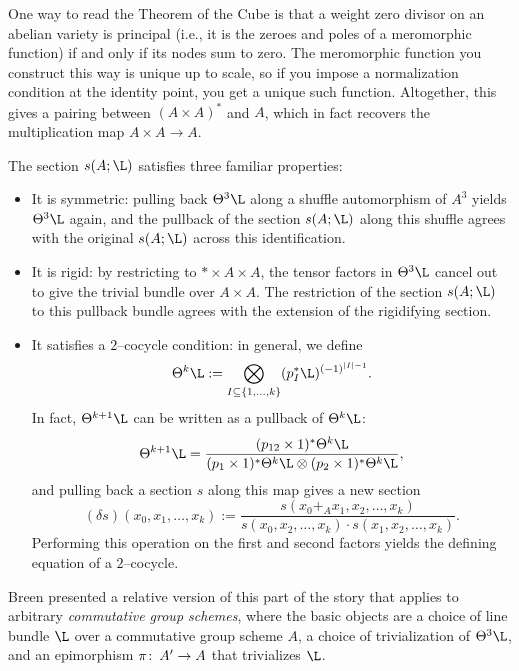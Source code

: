 \begin{remark}
One way to read the Theorem of the Cube is that a weight zero divisor on an abelian variety is principal (i.e., it is the zeroes and poles of a meromorphic function) if and only if its nodes sum to zero.
The meromorphic function you construct this way is unique up to scale, so if you impose a normalization condition at the identity point, you get a unique such function.
Altogether, this gives a pairing between \((A \times A)^*\) and \(A\), which in fact recovers the multiplication map \(A \times A \to A\).
\end{remark}

\begin{remark}
The section \(s(A; \L)\) satisfies three familiar properties:
\begin{itemize}
\item It is symmetric: pulling back \(\Theta^3 \L\) along a shuffle automorphism of \(A^3\) yields \(\Theta^3 \L\) again, and the pullback of the section \(s(A; \L)\) along this shuffle agrees with the original \(s(A; \L)\) across this identification.
\item It is rigid: by restricting to \(* \times A \times A\), the tensor factors in \(\Theta^3 \L\) cancel out to give the trivial bundle over \(A \times A\).
The restriction of the section \(s(A; \L)\) to this pullback bundle agrees with the extension of the rigidifying section.
\item It satisfies a \(2\)--cocycle condition: in general, we define \[\Theta^k \L := \bigotimes_{I \subseteq \{1, \ldots, k\}} (p_I^* \L)^{(-1)^{|I| - 1}}.\]
In fact, \(\Theta^{k+1} \L\) can be written as a pullback of \(\Theta^k \L\): \[\Theta^{k+1} \L = \frac{(p_{12} \times 1)^* \Theta^k \L}{(p_1 \times 1)^* \Theta^k \L \otimes (p_2 \times 1)^* \Theta^k \L},\] and pulling back a section \(s\) along this map gives a new section \[(\delta s)(x_0, x_1, \ldots, x_k) := \frac{s(x_0 +_A x_1, x_2, \ldots, x_k)}{s(x_0, x_2, \ldots, x_k) \cdot s(x_1, x_2, \ldots, x_k)}.\]
Performing this operation on the first and second factors yields the defining equation of a \(2\)--cocycle.
\end{itemize}
\end{remark}

\begin{remark}
Breen presented a relative version of this part of the story that applies to arbitrary \emph{commutative group schemes}, where the basic objects are a choice of line bundle \(\L\) over a commutative group scheme \(A\), a choice of trivialization of \(\Theta^3 \L\), and an epimorphism \(\pi\colon\thinspace A' \to A\) that trivializes \(\L\).
\end{remark}

